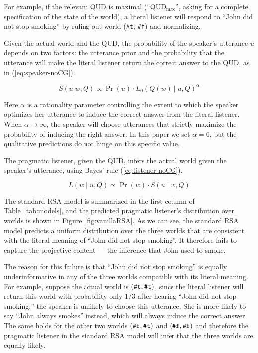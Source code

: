 For example, if the relevant QUD is maximal (``QUD$_\textrm{max}$'', asking for a complete specification of the state of the world), a literal listener will respond to ``John did not stop smoking'' by ruling out world (\verb+#t+, \verb+#f+) and normalizing.


Given the actual world and the QUD, the probability of 
 the speaker's utterance $u$ depends on two factors: the utterance prior 
 and the probability that the utterance will make the literal listener 
 return the correct answer to the QUD, as in (\ref{eq:speaker-noCG}).
 
\begin{equation}
S(u | w, Q) \propto \Pr(u) \cdot L_0(Q(w) \mid u, Q)^\alpha 
\label{eq:speaker-noCG}
\end{equation}

Here $\alpha$ is a rationality parameter controlling the extent to which 
 the speaker optimizes her utterance to induce the correct answer from the 
 literal listener. 
When $\alpha \rightarrow \infty$, the speaker will choose utterances that 
 strictly maximize the probability of inducing the right answer.
In this paper we set $\alpha=6$, but the qualitative predictions do not hinge on 
 this specific value.

The pragmatic listener, given the QUD, infers the actual world given the speaker's utterance, using Bayes' rule (\ref{eq:listener-noCG}).

\begin{equation}
L(w \mid u, Q) \propto \Pr(w) \cdot S(u \mid w, Q) \label{eq:listener-noCG}
\end{equation}

The standard RSA model is summarized in the first column of Table~\ref{tab:models},
 and the predicted pragmatic listener's distribution over worlds is shown in Figure~\ref{fig:vanillaRSA}.
As we can see, the standard RSA model predicts a uniform distribution over the
 three worlds that are consistent with the literal meaning of 
 ``John did not stop smoking''. It therefore fails to capture the projective content --- the inference that  
 John used to smoke.

The reason for this failure is that ``John did not stop smoking'' is equally
 underinformative in any of the three worlds compatible with its literal meaning.
For example, suppose the actual world is $(\verb+#t+, \verb+#t+)$, since the 
 literal listener will return this world with probability only $1/3$ after hearing ``John did not stop smoking,'' the speaker is unlikely to choose this utterance.
She is more likely to say ``John always smokes'' instead, which will always induce 
 the correct answer. 
The same holds for the other two worlds $(\verb+#f+, \verb+#t+)$ and $(\verb+#f+,
 \verb+#f+)$ and therefore the pragmatic listener in the standard RSA model will 
 infer that the three worlds are equally likely.
 
